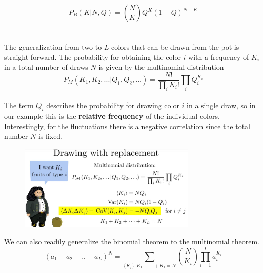 \documentclass[12pt, a4paper]{scrartcl}
\begin{document}
\begin{equation*}\boxed{P_B(K|N,Q)={N\choose K}Q^K(1-Q)^{N-K}
}\end{equation*}\\
\\

The generalization from two to $L$ colors that can be drawn from the pot is straight forward.
The probability for obtaining the color $i$ with a frequency of $K_i$ in a total number of draws $N$ is given by the multinomial distribution
\begin{equation*}\boxed{P_M(K_1,K_2,...|Q_1,Q_2,...)=\frac{N!}{\prod_iK_i!}\prod_iQ_i^{K_i}}\end{equation*}\\
The term $Q_i$ describes the probability for drawing color $i$ in a single draw, so in our example this is the \textbf{relative frequency} of the individual colors.
Interestingly, for the fluctuations there is a negative correlation since the total number $N$ is fixed.
 \begin{figure}[H]
	\centering
	\includegraphics[width=0.75\textwidth]{4_6.png}
\end{figure}
We can also readily generalize the binomial theorem to the multinomial theorem.\\%
\begin{equation*}\boxed{(a_1+a_2+..+a_L)^N=\sum_{\{K_i\}, K_1+\ldots+K_l=N}{N\choose{K_i}}\prod_{i=1}^{L}a_i^{K_i}
}\end{equation*}\\
\\
\end{document}
